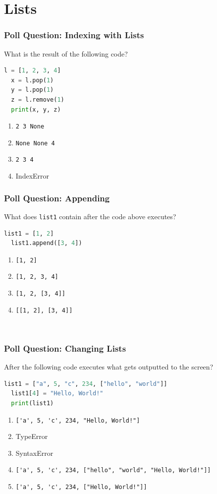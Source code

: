 \documentclass{beamer}
\begin{document}
\section{Lists}
%
%
\begin{frame}[fragile]
  \frametitle{Poll Question: Indexing with Lists}
  What is the result of the following code?
  \begin{lstlisting}[language=Python, autogobble]
  l = [1, 2, 3, 4]
  x = l.pop(1)
  y = l.pop(1)
  z = l.remove(1)
  print(x, y, z)
  \end{lstlisting}
  \vfill
  \begin{enumerate}[A] 
    \item \lstinline|2 3 None| %
    \item \lstinline|None None 4|
    \item \lstinline|2 3 4|
    \item IndexError
  \end{enumerate}
\end{frame}



%
%
\begin{frame}[fragile]
  \frametitle{Poll Question: Appending}
  What does \lstinline|list1| contain after the code above executes?
  \begin{lstlisting}[language=Python, autogobble]
  list1 = [1, 2]
  list1.append([3, 4])
  \end{lstlisting}
  \vfill
  \begin{enumerate}[A] 
    \item \lstinline|[1, 2]|
    \item \lstinline|[1, 2, 3, 4]|
    \item \lstinline|[1, 2, [3, 4]]| %
    \item \lstinline|[[1, 2], [3, 4]]|
  \end{enumerate}
  \
\end{frame}


%
%
\begin{frame}[fragile]
  \frametitle{Poll Question: Changing Lists}
  After the following code executes what gets outputted to the screen?
  \begin{lstlisting}[language=Python, autogobble]
  list1 = ["a", 5, "c", 234, ["hello", "world"]]
  list1[4] = "Hello, World!"
  print(list1)
  \end{lstlisting}
  \vfill
  \begin{enumerate}[A] 
    \item \lstinline|['a', 5, 'c', 234, "Hello, World!"]| %
    \item TypeError
    \item SyntaxError
    \item \lstinline|['a', 5, 'c', 234, ["hello", "world", "Hello, World!"]]|
    \item \lstinline|['a', 5, 'c', 234, ["Hello, World!"]]|
  \end{enumerate}
\end{frame}
\end{document}
